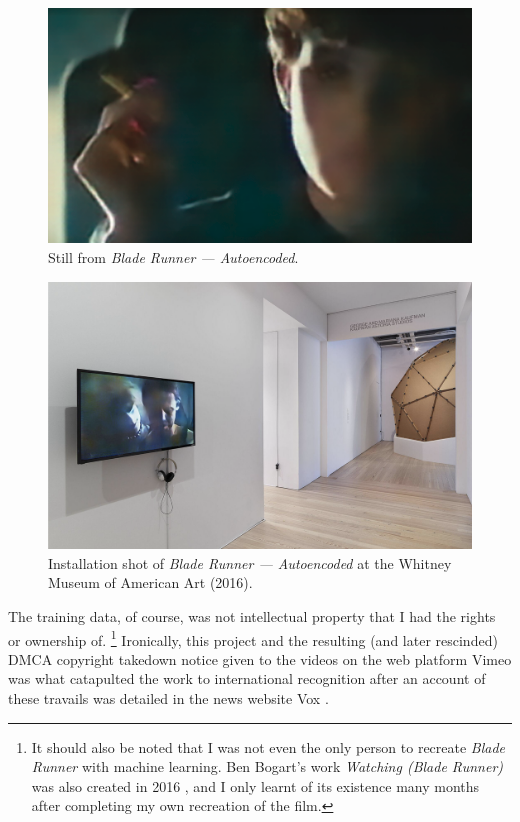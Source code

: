 \begin{figure}[!htb]
    \centering
    \captionsetup{justification=centering}
    \includegraphics[width=1\textwidth]{figures/c1_intro/blade_runner_still.png}
    \caption{Still from \textit{Blade Runner --- Autoencoded}.}
    \label{fig:c1:blade-runner}
\end{figure}

\begin{figure}[!htb]
    \centering
    \captionsetup{justification=centering}
    \includegraphics[width=1\textwidth]{figures/c1_intro/whitney-installation-shot.png}
    \caption[Installation shot of of \textit{Blade Runner --- Autoencoded}]{Installation shot of \textit{Blade Runner --- Autoencoded} at the Whitney Museum of American Art (2016).}
    \label{fig:c1:blade-runner-whitney}
\end{figure}

The training data, of course, was not intellectual property that I had the rights or ownership of. \footnote{It should also be noted that I was not even the only person to recreate \textit{Blade Runner} with machine learning. Ben Bogart's work \textit{Watching (Blade Runner)} was also created in 2016 \citep{bogart2016watching}, and I only learnt of its existence many months after completing my own recreation of the film.}
Ironically, this project and the resulting (and later rescinded) DMCA copyright takedown notice given to the videos on the web platform Vimeo was what catapulted the work to international recognition after an account of these travails was detailed in the news website Vox \citep{romano2016bladerunner}.

